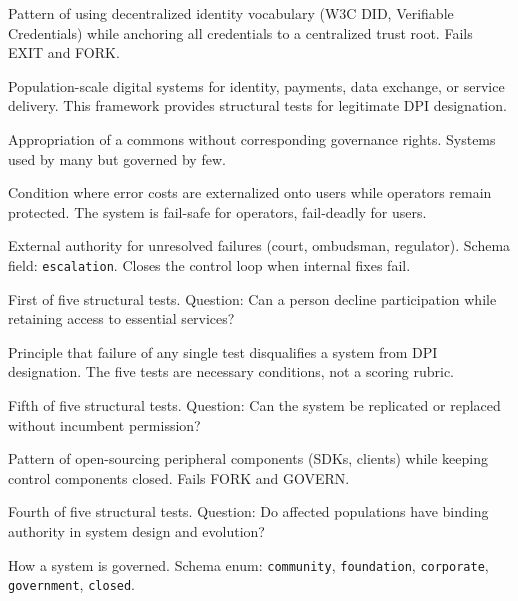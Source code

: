\documentclass[11pt,a4paper]{article}
\begin{document}
\begin{description}[style=nextline, leftmargin=2cm]
\item[DID-Washing] Pattern of using decentralized identity vocabulary (W3C DID, Verifiable Credentials) while anchoring all credentials to a centralized trust root. Fails EXIT and FORK.

\item[Digital Public Infrastructure (DPI)] Population-scale digital systems for identity, payments, data exchange, or service delivery. This framework provides structural tests for legitimate DPI designation.

\item[Enclosure] Appropriation of a commons without corresponding governance rights. Systems used by many but governed by few.

\item[Error Asymmetry] Condition where error costs are externalized onto users while operators remain protected. The system is fail-safe for operators, fail-deadly for users.

\item[Escalation Path] External authority for unresolved failures (court, ombudsman, regulator). Schema field: \texttt{escalation}. Closes the control loop when internal fixes fail.

\item[EXIT] First of five structural tests. Question: Can a person decline participation while retaining access to essential services?

\item[Fatal Failure Property] Principle that failure of any single test disqualifies a system from DPI designation. The five tests are necessary conditions, not a scoring rubric.

\item[FORK] Fifth of five structural tests. Question: Can the system be replicated or replaced without incumbent permission?

\item[Funnel Open-Sourcing] Pattern of open-sourcing peripheral components (SDKs, clients) while keeping control components closed. Fails FORK and GOVERN.

\item[GOVERN] Fourth of five structural tests. Question: Do affected populations have binding authority in system design and evolution?

\item[Governance Model] How a system is governed. Schema enum: \texttt{community}, \texttt{foundation}, \texttt{corporate}, \texttt{government}, \texttt{closed}.


\end{description}
\end{document}
